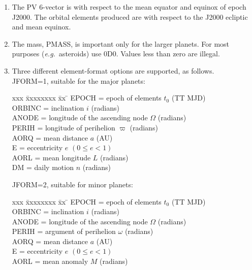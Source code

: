 \documentclass[11pt,twoside]{article}
\begin{document}
{
 \begin{enumerate}
  \item The PV 6-vector is with respect to the mean equator and equinox of
        epoch J2000.  The orbital elements produced are with respect to
        the J2000 ecliptic and mean equinox.
  \item The mass, PMASS, is important only for the larger planets.  For
        most purposes ({\it e.g.}~asteroids) use 0D0.  Values less than zero
        are illegal.
  \item Three different element-format options are supported, as
        follows. \\

        JFORM=1, suitable for the major planets:

        \begin{tabbing}
        xxx \= xxxxxxxx \= xx \= \kill
        \> EPOCH  \> = \> epoch of elements $t_0$ (TT MJD) \\
        \> ORBINC \> = \> inclination $i$ (radians) \\
        \> ANODE  \> = \> longitude of the ascending node $\Omega$ (radians) \\
        \> PERIH  \> = \> longitude of perihelion $\varpi$ (radians) \\
        \> AORQ   \> = \> mean distance $a$ (AU) \\
        \> E      \> = \> eccentricity $e$ $( 0 \leq e < 1 )$ \\
        \> AORL   \> = \> mean longitude $L$ (radians) \\
        \> DM     \> = \> daily motion $n$ (radians)
        \end{tabbing}

        JFORM=2, suitable for minor planets:

        \begin{tabbing}
        xxx \= xxxxxxxx \= xx \= \kill
        \> EPOCH  \> = \> epoch of elements $t_0$ (TT MJD) \\
        \> ORBINC \> = \> inclination $i$ (radians) \\
        \> ANODE  \> = \> longitude of the ascending node $\Omega$ (radians) \\
        \> PERIH  \> = \> argument of perihelion $\omega$ (radians) \\
        \> AORQ   \> = \> mean distance $a$ (AU) \\
        \> E      \> = \> eccentricity $e$ $( 0 \leq e < 1 )$ \\
        \> AORL   \> = \> mean anomaly $M$ (radians)
        \end{tabbing}


\end{enumerate}}
\end{document}
